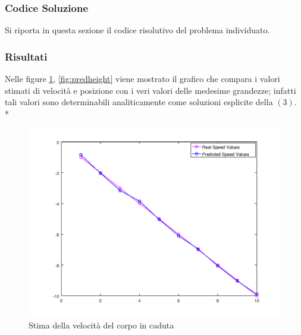 \subsubsection{Codice Soluzione}
Si riporta in questa sezione il codice risolutivo del problema individuato.



\newpage

\newpage
\subsubsection{Risultati}
Nelle figure \ref{fig:predspeed}, \ref{fig:predheight} viene mostrato il grafico che compara i valori stimati di velocit\`a e posizione con i veri valori delle medesime grandezze; infatti tali valori sono determinabili analiticamente come soluzioni esplicite della $(3)$.\\*
\begin{figure}[h]
	\centering
	\includegraphics[scale=0.45]{img/predspeed}
	\caption{Stima della velocit\`a del corpo in caduta}
	\label{fig:predspeed}
\end{figure}

